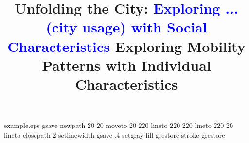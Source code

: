 %
%
%
%
%
\begin{filecontents*}{example.eps}
gsave
newpath
  20 20 moveto
  20 220 lineto
  220 220 lineto
  220 20 lineto
closepath
2 setlinewidth
gsave
  .4 setgray fill
grestore
stroke
grestore
\end{filecontents*}
%
\RequirePackage{fix-cm}
%
\documentclass{svjour3}                     %
%
\smartqed  %
%
\usepackage{graphicx}
\usepackage{epstopdf}
\usepackage{subfigure}

\usepackage{mathptmx}

\usepackage{times}

\usepackage{algorithm}%
\usepackage{algpseudocode}%

\usepackage{url}
\usepackage{color}
\newcommand{\m}{\textcolor{black}}

\usepackage{xcolor}
\newcommand{\add}{\textcolor{blue}}

\usepackage{multirow}
\usepackage{tabularx}

\usepackage{algpseudocode}
\usepackage{natbib}
\usepackage[misc]{ifsym}
%
%
%
%
%


\title{Unfolding the City: \textcolor{blue}{Exploring ...(city usage) with Social Characteristics} Exploring Mobility Patterns with Individual Characteristics}

